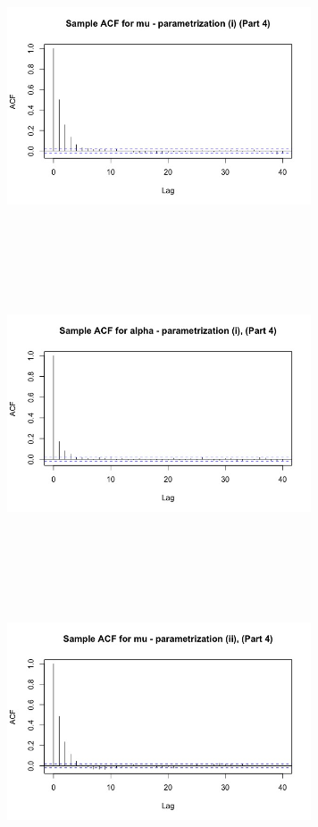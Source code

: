 \documentclass[10pt,a4paper]{article}
\begin{document}
\includegraphics[width=9cm,height=9cm,keepaspectratio]{part4mu1}
\includegraphics[width=9cm,height=9cm,keepaspectratio]{part4alpha1}
\includegraphics[width=9cm,height=9cm,keepaspectratio]{part4mu2}
\end{document}
